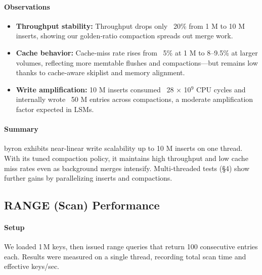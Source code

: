 \documentclass[10pt]{article}
\begin{document}
\paragraph{Observations}
\begin{itemize}[itemsep=0.5ex]
  \item \textbf{Throughput stability:} Throughput drops only ~20\% from 1 M to 10 M inserts, showing our golden‐ratio compaction spreads out merge work.
  \item \textbf{Cache behavior:} Cache‐miss rate rises from ~5\% at 1 M to 8–9.5\% at larger volumes, reflecting more memtable flushes and compactions—but remains low thanks to cache‐aware skiplist and memory alignment.
  \item \textbf{Write amplification:} 10 M inserts consumed ~28 × 10\(^9\) CPU cycles and internally wrote ~50 M entries across compactions, a moderate amplification factor expected in LSMs.
\end{itemize}

\paragraph{Summary}
byron exhibits near-linear write scalability up to 10 M inserts on one thread.  With its tuned compaction policy, it maintains high throughput and low cache miss rates even as background merges intensify. Multi-threaded tests (§4) show further gains by parallelizing inserts and compactions.

\subsection{RANGE (Scan) Performance}

\paragraph{Setup}
We loaded 1\,M keys, then issued range queries that return 100 consecutive entries each. Results were measured on a single thread, recording total scan time and effective keys/sec.
\end{document}
